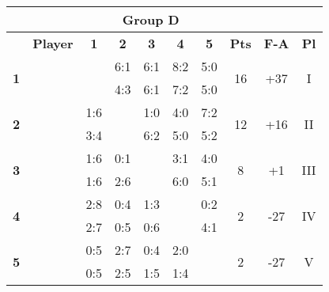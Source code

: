 \documentclass[10pt]{article}
\newcommand{\red}{\color{red}}
\newcommand{\blue}{\color{blue}}
\newcommand{\blank}{\cellcolor[gray]{.5}}
\begin{document}
\begin{tabular}{|c|p{2.8cm}|c|c|c|c|c|c|c|c|}
	\multicolumn{9}{c}{\bf Group D} \\ \hline
	& \bf Player & \bf1 & \bf2 & \bf3 & \bf4 & \bf5 & \bf Pts & \bf F-A & \bf Pl \\ \hline
	\multirow{2}{*}{\bf1}&\multirow{2}{*}{}      & \blank & \red6:1 & \red6:1 & \red8:2 & \red5:0 &\multirow{2}{*}{16}&\multirow{2}{*}{+37}&\multirow{2}{*}{I} \\ && \blank & \red4:3 & \red6:1 & \red7:2 & \red5:0 &&& \\ \hline
	\multirow{2}{*}{\bf2}&\multirow{2}{*}{}     & \blue1:6 & \blank & \red1:0 & \red4:0 & \red7:2 &\multirow{2}{*}{12}&\multirow{2}{*}{+16}&\multirow{2}{*}{II} \\  && \blue3:4 & \blank & \red6:2 & \red5:0 & \red5:2 &&& \\ \hline
	\multirow{2}{*}{\bf3}&\multirow{2}{*}{}     & \blue1:6 & \blue0:1 & \blank & \red3:1 & \red4:0 &\multirow{2}{*}{8}&\multirow{2}{*}{+1}&\multirow{2}{*}{III} \\     && \blue1:6 & \blue2:6 & \blank & \red6:0 & \red5:1 &&& \\ \hline
	\multirow{2}{*}{\bf4}&\multirow{2}{*}{}     & \blue2:8 & \blue0:4 & \blue1:3 & \blank & \blue0:2 &\multirow{2}{*}{2}&\multirow{2}{*}{-27}&\multirow{2}{*}{IV} \\     && \blue2:7 & \blue0:5 & \blue0:6 & \blank & \red4:1 &&& \\ \hline
	\multirow{2}{*}{\bf5}&\multirow{2}{*}{}     & \blue0:5 & \blue2:7 & \blue0:4 & \red2:0 & \blank &\multirow{2}{*}{2}&\multirow{2}{*}{-27}&\multirow{2}{*}{V} \\     && \blue0:5 & \blue2:5 & \blue1:5 & \blue1:4 & \blank &&& \\ \hline
\end{tabular}
\hspace{-5cm}
\end{document}
